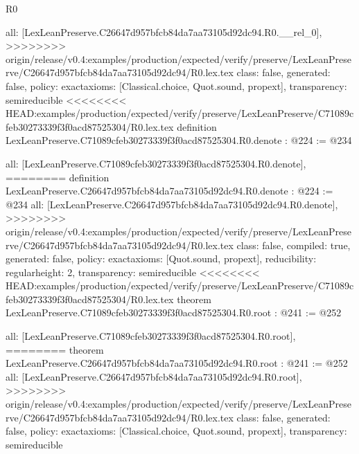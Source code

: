 \begin{lexlean}{R0}
\begin{coremodule}
{{{{  all: [LexLeanPreserve.C26647d957bfcb84da7aa73105d92dc94.R0.__rel_0],
>>>>>>>> origin/release/v0.4:examples/production/expected/verify/preserve/LexLeanPreserve/C26647d957bfcb84da7aa73105d92dc94/R0.lex.tex
  class: false,
  generated: false,
  policy: exact{axioms: [Classical.choice, Quot.sound, propext]},
  transparency: semireducible
}
<<<<<<<< HEAD:examples/production/expected/verify/preserve/LexLeanPreserve/C71089cfeb30273339f3f0acd87525304/R0.lex.tex
definition LexLeanPreserve.C71089cfeb30273339f3f0acd87525304.R0.denote : @224 := @234 {
  all: [LexLeanPreserve.C71089cfeb30273339f3f0acd87525304.R0.denote],
========
definition LexLeanPreserve.C26647d957bfcb84da7aa73105d92dc94.R0.denote : @224 := @234 {
  all: [LexLeanPreserve.C26647d957bfcb84da7aa73105d92dc94.R0.denote],
>>>>>>>> origin/release/v0.4:examples/production/expected/verify/preserve/LexLeanPreserve/C26647d957bfcb84da7aa73105d92dc94/R0.lex.tex
  class: false,
  compiled: true,
  generated: false,
  policy: exact{axioms: [Quot.sound, propext]},
  reducibility: regular{height: 2},
  transparency: semireducible
}
<<<<<<<< HEAD:examples/production/expected/verify/preserve/LexLeanPreserve/C71089cfeb30273339f3f0acd87525304/R0.lex.tex
theorem LexLeanPreserve.C71089cfeb30273339f3f0acd87525304.R0.root : @241 := @252 {
  all: [LexLeanPreserve.C71089cfeb30273339f3f0acd87525304.R0.root],
========
theorem LexLeanPreserve.C26647d957bfcb84da7aa73105d92dc94.R0.root : @241 := @252 {
  all: [LexLeanPreserve.C26647d957bfcb84da7aa73105d92dc94.R0.root],
>>>>>>>> origin/release/v0.4:examples/production/expected/verify/preserve/LexLeanPreserve/C26647d957bfcb84da7aa73105d92dc94/R0.lex.tex
  class: false,
  generated: false,
  policy: exact{axioms: [Classical.choice, Quot.sound, propext]},
  transparency: semireducible
}

}}}}}
\end{coremodule}
\end{lexlean}
